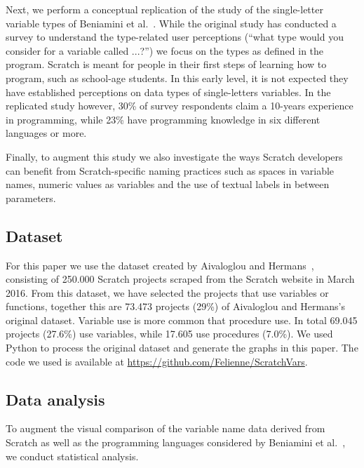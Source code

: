 \documentclass[conference]{IEEEtran}
\begin{document}
Next, we perform a conceptual replication of the study of the single-letter variable types of Beniamini et al.~\cite{Beniamini}. 
While the original study has conducted a survey to understand the type-related user perceptions (``what type would you consider for a variable called ...?'') we focus on the types as defined in the program. Scratch is meant for people in their first steps of learning how to program, such as school-age students. In this early level, it is not expected they have established perceptions on data types of single-letters variables. In the replicated study however, 30\% of survey respondents claim a 10-years experience in programming, while  23\% have programming knowledge in six different languages or more. 

Finally, to augment this study we also investigate the ways Scratch developers can benefit from Scratch-specific naming practices such as spaces in variable names, numeric values as variables and the use of textual labels in between parameters.

\subsection{Dataset}
For this paper we use the dataset created by Aivaloglou and Hermans~\cite{Aivaloglou2016HowKC}, consisting of 250.000 Scratch projects scraped from the Scratch website in March 2016. From this dataset, we have selected the projects that use variables or functions, together this are 73.473 projects (29\%) of Aivaloglou and Hermans's original dataset. Variable use is more common that procedure use. In total 69.045 projects (27.6\%) use variables, while 17.605 use procedures (7.0\%). We used Python to process the original dataset and generate the graphs in this paper. The code we used is available at \url{https://github.com/Felienne/ScratchVars}.

\subsection{Data analysis}
\label{sec:da}
To augment the visual comparison of the variable name data derived from Scratch as well as the programming languages considered by Beniamini et al.~\cite{Beniamini}, we conduct statistical analysis. 
\end{document}
